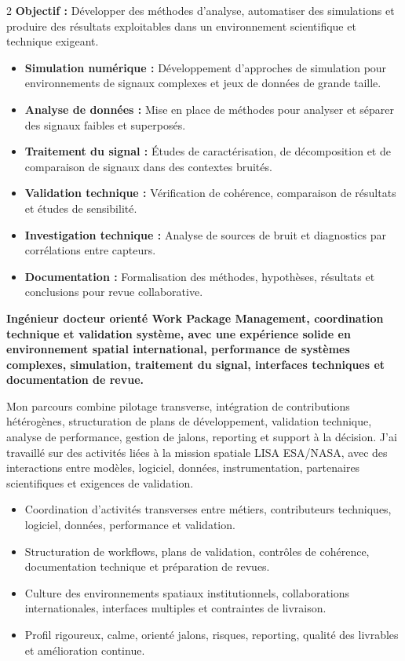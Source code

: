 \documentclass[8pt,a4paper,ragged2e,withhyper]{altacv}
\begin{document}
\begin{paracol}{2}
\textbf{Objectif :} Développer des méthodes d’analyse, automatiser des simulations et produire des résultats exploitables dans un environnement scientifique et technique exigeant.

\begin{itemize}
  \item \textbf{Simulation numérique :} Développement d’approches de simulation pour environnements de signaux complexes et jeux de données de grande taille.
  \item \textbf{Analyse de données :} Mise en place de méthodes pour analyser et séparer des signaux faibles et superposés.
  \item \textbf{Traitement du signal :} Études de caractérisation, de décomposition et de comparaison de signaux dans des contextes bruités.
  \item \textbf{Validation technique :} Vérification de cohérence, comparaison de résultats et études de sensibilité.
  \item \textbf{Investigation technique :} Analyse de sources de bruit et diagnostics par corrélations entre capteurs.
  \item \textbf{Documentation :} Formalisation des méthodes, hypothèses, résultats et conclusions pour revue collaborative.
\end{itemize}

\switchcolumn


\textbf{Ingénieur docteur orienté Work Package Management, coordination technique et validation système, avec une expérience solide en environnement spatial international, performance de systèmes complexes, simulation, traitement du signal, interfaces techniques et documentation de revue.}

Mon parcours combine pilotage transverse, intégration de contributions hétérogènes, structuration de plans de développement, validation technique, analyse de performance, gestion de jalons, reporting et support à la décision. J’ai travaillé sur des activités liées à la mission spatiale LISA ESA/NASA, avec des interactions entre modèles, logiciel, données, instrumentation, partenaires scientifiques et exigences de validation.

\begin{itemize}
  \item Coordination d’activités transverses entre métiers, contributeurs techniques, logiciel, données, performance et validation.
  \item Structuration de workflows, plans de validation, contrôles de cohérence, documentation technique et préparation de revues.
  \item Culture des environnements spatiaux institutionnels, collaborations internationales, interfaces multiples et contraintes de livraison.
  \item Profil rigoureux, calme, orienté jalons, risques, reporting, qualité des livrables et amélioration continue.
\end{itemize}


\end{paracol}
\end{document}
